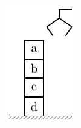 \documentclass[default]{beamer}
\begin{document}
\begin{frame}
\begin{columns}
\begin{column}{0.3\textwidth}
				\includegraphics[page=3,width=\textwidth]{plan/block_world}
			\end{column}
		\end{columns}
	\end{frame}
\end{document}
